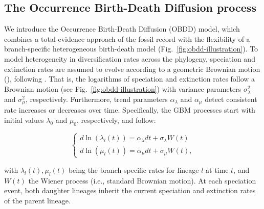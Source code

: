 \documentclass[oupdraft]{sysbio}
\newcommand{\revised}[1]{{\color{blue} #1}}
\begin{document}
\subsection{The Occurrence Birth-Death Diffusion process}\label{OBDD}

We introduce the Occurrence Birth-Death Diffusion (OBDD) model, which combines a total-evidence approach of the fossil record with the flexibility of a branch-specific heterogeneous birth-death model (Fig.~\ref{fig:obdd-illustration}). To model heterogeneity in diversification rates across the phylogeny, speciation and extinction rates are assumed to evolve according to a geometric Brownian motion (), following \citet{quintero_imbalanced_2024}. That is, the logarithms of speciation and extinction rates follow a Brownian motion (see Fig.~\ref{fig:obdd-illustration}) with variance parameters $\sigma_{\lambda}^2$ and $\sigma_{\mu}^2$, respectively. Furthermore, trend parameters $\alpha_{\lambda}$ and $\alpha_{\mu}$ detect consistent rate increases or decreases over time. Specifically, the GBM processes start with initial values $\lambda_0$ and $\mu_0$, respectively, and follow:

\begin{equation}
    \begin{cases}
        d\ln(\lambda_l(t)) = \alpha_{\lambda}dt + \sigma_{\lambda}W(t)\\
        d\ln(\mu_l(t)) = \alpha_{\mu}dt + \sigma_{\mu}W(t),
    \end{cases}
\end{equation}

with $\lambda_l(t), \mu_l(t)$ being the branch-specific rates for lineage $l$ at time $t$, and $W(t)$ the Wiener process (i.e., standard Brownian motion). \revised{At each speciation event, both daughter lineages inherit the current speciation and extinction rates of the parent lineage.}
\end{document}
